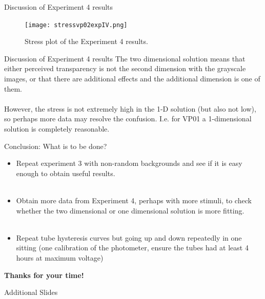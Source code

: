 \documentclass{beamer}
\begin{document}
\begin{frame}[t]{Discussion of Experiment 4 results}
\begin{figure}[c]
\texttt{[image: stressvp02expIV.png]}
\caption{Stress plot of the Experiment 4 results.}
\end{figure}
\end{frame}

\begin{frame}[t]{Discussion of Experiment 4 results}
The two dimensional solution means that either perceived transparency is not the second dimension with the grayscale images, or that there are additional effects and the additional dimension is one of them.\\
~\\
However, the stress is not extremely high in the 1-D solution (but also not low), so perhaps more data may resolve the confusion. I.e. for VP01 a 1-dimensional solution is completely reasonable.
\end{frame}

\begin{frame}[t]{Conclusion: What is to be done?}
\begin{itemize}
\item Repeat experiment 3 with non-random backgrounds and see if it is easy enough to obtain useful results.\\
~\\
\item Obtain more data from Experiment 4, perhaps with more stimuli, to check whether the two dimensional or one dimensional solution is more fitting.\\
~\\
\item Repeat tube hysteresis curves but going up and down repeatedly in one sitting (one calibration of the photometer, ensure the tubes had at least 4 hours at maximum voltage)

\end{itemize}

{\bf Thanks for your time!}
\end{frame}
\begin{frame}[t]{Additional Slides}
\end{frame}
\end{document}

